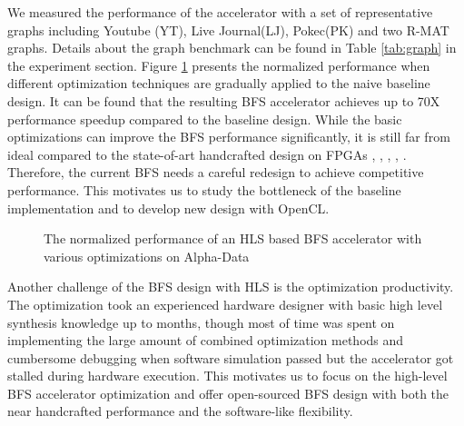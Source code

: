 We measured the performance of the accelerator with a set of representative graphs 
including Youtube (YT), Live Journal(LJ), Pokec(PK) and two R-MAT graphs. Details about the 
graph benchmark can be found in Table \ref{tab:graph} in the experiment section. 
Figure \ref{fig:opt-performance} presents the normalized performance
when different optimization techniques are gradually applied to the naive baseline design.
It can be found that the resulting BFS accelerator achieves up to 70X performance speedup
compared to the baseline design. While the basic optimizations can improve the BFS
performance significantly, it is still far from ideal compared to the state-of-art 
handcrafted design on FPGAs \cite{betkaoui2012reconfigurable}, 
\cite{attia2014cygraph}, \cite{zhang2017boosting}, \cite{nurvitadhi2014graphgen},
\cite{dai2016fpgp}. Therefore, the current BFS needs a careful redesign to achieve 
competitive performance. This motivates us to study the bottleneck of 
the baseline implementation and to develop new design with OpenCL.

\begin{figure}
    \caption{The normalized performance of an HLS based BFS accelerator with various optimizations on Alpha-Data}
\label{fig:opt-performance}
\vspace{-1em}
\end{figure}

Another challenge of the BFS design with HLS is the optimization productivity. 
The optimization took an experienced hardware designer 
with basic high level synthesis knowledge up to months, though most of time was 
spent on implementing the large amount of combined optimization methods and cumbersome
debugging when software simulation passed but the accelerator got stalled 
during hardware execution. This motivates us to focus on the high-level BFS 
accelerator optimization and offer open-sourced BFS design with both 
the near handcrafted performance and the software-like flexibility.
 

